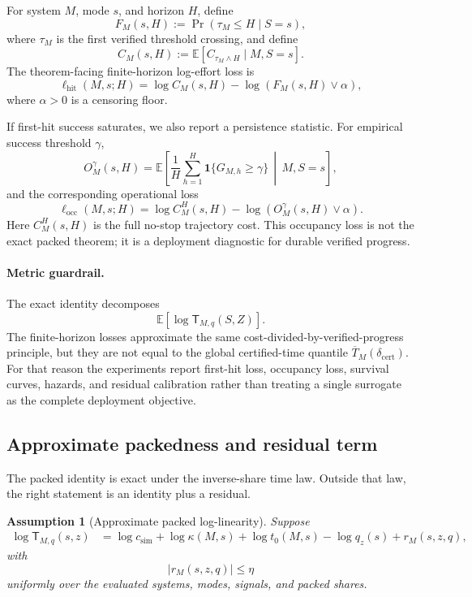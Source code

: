 \documentclass{article}
\newtheorem{assumption}{Assumption}
\newcommand{\E}{\mathbb{E}}
\newcommand{\one}{\mathbf{1}}
\begin{document}
For system \(M\), mode \(s\), and horizon \(H\), define
\[
    F_M(s,H):=\Pr(\tau_M\le H\mid S=s),
\]
where \(\tau_M\) is the first verified threshold crossing, and define
\[
    C_M(s,H):=\E[C_{\tau_M\wedge H}\mid M,S=s].
\]
The theorem-facing finite-horizon log-effort loss is
\[
    \ell_{\mathrm{hit}}(M,s;H)
    =
    \log C_M(s,H)-\log(F_M(s,H)\vee\alpha),
\]
where \(\alpha>0\) is a censoring floor.

If first-hit success saturates, we also report a persistence statistic.  For empirical
success threshold \(\gamma\),
\[
    O_M^\gamma(s,H)
    =
    \E\left[
        \frac1H\sum_{h=1}^H
        \one\{G_{M,h}\ge\gamma\}
        \,\middle|\,
        M,S=s
    \right],
\]
and the corresponding operational loss
\[
    \ell_{\mathrm{occ}}(M,s;H)
    =
    \log C_M^H(s,H)-\log(O_M^\gamma(s,H)\vee\alpha).
\]
Here \(C_M^H(s,H)\) is the full no-stop trajectory cost.
This occupancy loss is not the exact packed theorem; it is a deployment diagnostic for
durable verified progress.

\paragraph{Metric guardrail.}
The exact identity decomposes
\[
    \E[\log \mathsf T_{M,q}(S,Z)].
\]
The finite-horizon losses approximate the same cost-divided-by-verified-progress principle,
but they are not equal to the global certified-time quantile
\(\overline T_M(\delta_{\mathrm{cert}})\).
For that reason the experiments report first-hit loss, occupancy loss, survival curves,
hazards, and residual calibration rather than treating a single surrogate as the complete
deployment objective.

\subsection{Approximate packedness and residual term}

The packed identity is exact under the inverse-share time law.  Outside that law, the
right statement is an identity plus a residual.

\begin{assumption}[Approximate packed log-linearity]
\label{ass:app-approx-packed}
Suppose
\[
\begin{aligned}
    \log \mathsf T_{M,q}(s,z)
    &=
    \log c_{\mathrm{sim}}
    +
    \log\kappa(M,s)
    +
    \log t_0(M,s)
    -
    \log q_z(s)
    +
    r_M(s,z,q),
\end{aligned}
\]
with
\[
    |r_M(s,z,q)|\le \eta
\]
uniformly over the evaluated systems, modes, signals, and packed shares.
\end{assumption}
\end{document}
